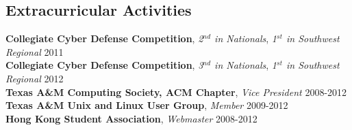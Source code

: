 \documentclass[margin,line]{res}
\newenvironment{list2}{
  \begin{list}{$\bullet$}{%
      \setlength{\itemsep}{0in}
      \setlength{\parsep}{0in} \setlength{\parskip}{0in}
      \setlength{\topsep}{0in} \setlength{\partopsep}{0in} 
      \setlength{\leftmargin}{0.18in}}}{\end{list}}
\begin{document}
\begin{resume}
%
%
\section{\sc Extracurricular Activities}
{\bf Collegiate Cyber Defense Competition}, {\em 2$^{nd}$ in Nationals}, {\em 1$^{st}$ in Southwest Regional}  \hfill 2011 \\
{\bf Collegiate Cyber Defense Competition}, {\em 3$^{nd}$ in Nationals}, {\em 1$^{st}$ in Southwest Regional}  \hfill 2012 \\
{\bf Texas A\&M Computing Society, ACM Chapter}, {\em Vice President} \hfill 2008-2012 \\
{\bf Texas A\&M Unix and Linux User Group}, {\em Member} \hfill 2009-2012 \\
{\bf Hong Kong Student Association}, {\em Webmaster} \hfill 2008-2012

%
%


%
%

\end{resume}
\end{document}

